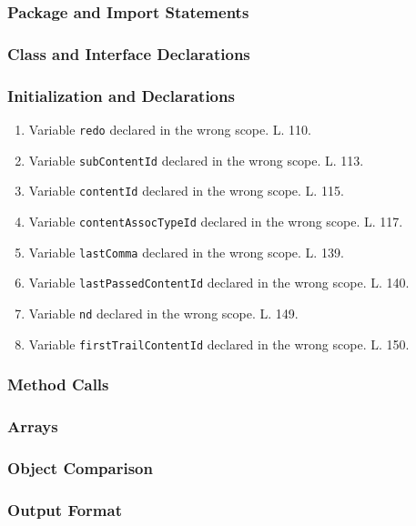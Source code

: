 \subsubsection{Package and Import Statements}

\subsubsection{Class and Interface Declarations}

\subsubsection{Initialization and Declarations}

\begin{enumerate}
	\item Variable \texttt{redo} declared in the wrong scope. L. 110.
	\item Variable \texttt{subContentId} declared in the wrong scope. L. 113.
	\item Variable \texttt{contentId} declared in the wrong scope. L. 115.
	\item Variable \texttt{contentAssocTypeId} declared in the wrong scope. L. 117.
	\item Variable \texttt{lastComma} declared in the wrong scope. L. 139.
	\item Variable \texttt{lastPassedContentId} declared in the wrong scope. L. 140.
	\item Variable \texttt{nd} declared in the wrong scope. L. 149.
	\item Variable \texttt{firstTrailContentId} declared in the wrong scope. L. 150.
\end{enumerate}

\subsubsection{Method Calls}

\subsubsection{Arrays}

\subsubsection{Object Comparison}

\subsubsection{Output Format}

